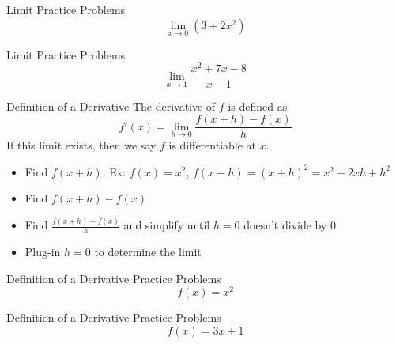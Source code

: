 \documentclass[aspectratio=169]{beamer}
\begin{document}
\begin{frame}{Limit Practice Problems}\label{main1}
    \vspace{-4cm}
    \[
    \lim_{x \to 0} (3 + 2x^{2})
    \]
\end{frame}

\begin{frame}{Limit Practice Problems}\label{main1}
	\vspace{-4cm}
    \[
    \lim_{x \to 1} \frac{x^{2} + 7x - 8}{x - 1} 
    \]
\end{frame}

\begin{frame}{Definition of a Derivative}\label{main1}
The derivative of \(f\) is defined as
\[
f'(x) = \lim_{h \to 0} \frac{f(x + h) - f(x)}{h}
\]
If this limit exists, then we say \(f\) is differentiable at \(x\).
\begin{itemize}
	\begin{itemize}
    \item Find \(f(x + h)\). Ex: \(f(x) = x^2\), \(f(x + h) = (x + h)^2 = x^2 + 2xh + h^2\)
    \item Find \(f(x + h) - f(x)\)
    \item Find \(\frac{f(x + h) - f(x)}{h}\) and simplify until \(h = 0\) doesn’t divide by 0
    \item Plug-in \(h = 0\) to determine the limit
    \end{itemize}
\end{itemize}
\end{frame}

\begin{frame}{Definition of a Derivative Practice Problems}\label{main1}
	\vspace{-4cm}
    \[
    f(x) = x^{2}
    \]
\end{frame}

\begin{frame}{Definition of a Derivative Practice Problems}\label{main3}
    \vspace{-4cm}
    \[
    f(x) = 3x + 1
    \]
\end{frame}
\end{document}
